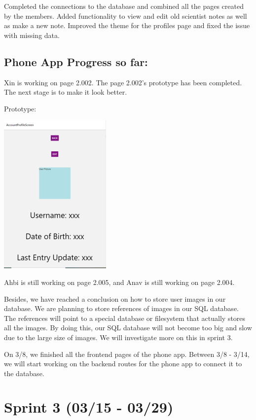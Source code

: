 \documentclass[]{book}
\begin{document}
Completed the connections to the database and combined all the pages created by the members. Added functionality to view and edit old scientist notes as well as make a new note. Improved the theme for the profiles page and fixed the issue with missing data.

\hypertarget{phone-app-progress-so-far}{%
\subsection{Phone App Progress so far:}\label{phone-app-progress-so-far}}

Xin is working on page 2.002. The page 2.002's prototype has been completed. The next stage is to make it look better.

Prototype:

\includegraphics{images/mobile_prototype.png}

Ahbi is still working on page 2.005, and Anav is still working on page 2.004.

Besides, we have reached a conclusion on how to store user images in our database. We are planning to store references of images in our SQL database. The references will point to a special database or filesystem that actually stores all the images. By doing this, our SQL database will not become too big and slow due to the large size of images. We will investigate more on this in sprint 3.

On 3/8, we finished all the frontend pages of the phone app. Between 3/8 - 3/14, we will start working on the backend routes for the phone app to connect it to the database.

\hypertarget{sprint-3-0315---0329}{%
\section{Sprint 3 (03/15 - 03/29)}\label{sprint-3-0315---0329}}
\end{document}
